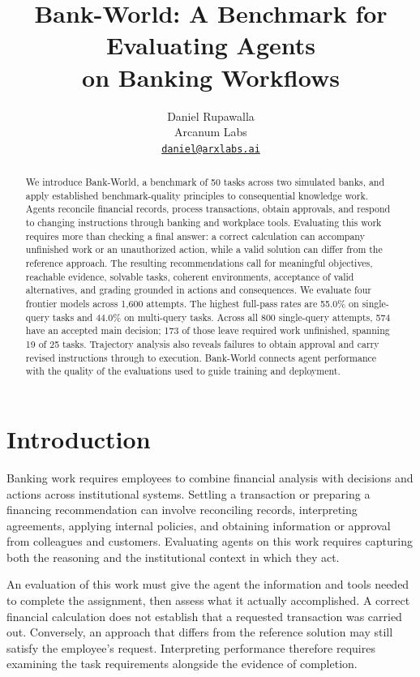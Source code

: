 \documentclass[11pt,letterpaper]{article}
\title{Bank-World: A Benchmark for Evaluating Agents\\on Banking Workflows}
\author{Daniel Rupawalla \\ Arcanum Labs \\ \href{mailto:daniel@arxlabs.ai}{\texttt{daniel@arxlabs.ai}}}
\date{}
\begin{document}
\maketitle
\begin{abstract}
We introduce Bank-World, a benchmark of 50 tasks across two simulated banks, and apply established benchmark-quality principles to consequential knowledge work. Agents reconcile financial records, process transactions, obtain approvals, and respond to changing instructions through banking and workplace tools. Evaluating this work requires more than checking a final answer: a correct calculation can accompany unfinished work or an unauthorized action, while a valid solution can differ from the reference approach. The resulting recommendations call for meaningful objectives, reachable evidence, solvable tasks, coherent environments, acceptance of valid alternatives, and grading grounded in actions and consequences. We evaluate four frontier models across 1,600 attempts. The highest full-pass rates are 55.0\% on single-query tasks and 44.0\% on multi-query tasks. Across all 800 single-query attempts, 574 have an accepted main decision; 173 of those leave required work unfinished, spanning 19 of 25 tasks. Trajectory analysis also reveals failures to obtain approval and carry revised instructions through to execution. Bank-World connects agent performance with the quality of the evaluations used to guide training and deployment.
\end{abstract}
\section{Introduction}
Banking work requires employees to combine financial analysis with decisions and actions across institutional systems. Settling a transaction or preparing a financing recommendation can involve reconciling records, interpreting agreements, applying internal policies, and obtaining information or approval from colleagues and customers. Evaluating agents on this work requires capturing both the reasoning and the institutional context in which they act.

An evaluation of this work must give the agent the information and tools needed to complete the assignment, then assess what it actually accomplished. A correct financial calculation does not establish that a requested transaction was carried out. Conversely, an approach that differs from the reference solution may still satisfy the employee's request. Interpreting performance therefore requires examining the task requirements alongside the evidence of completion.
\end{document}
